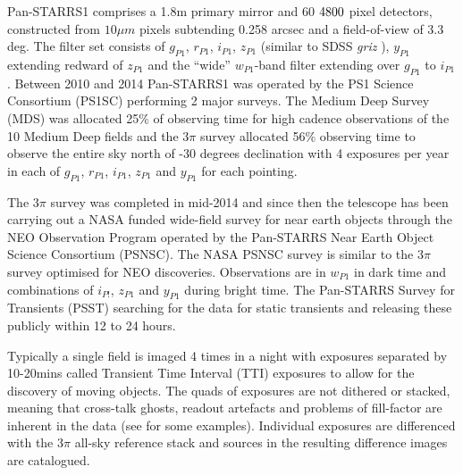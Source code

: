 \documentclass[a4paper,fleqn,usenatbib]{mnras}
\begin{document}


Pan-STARRS1 comprises a 1.8m primary mirror \citep{Kaiser10} and 60 $4800\time 4800$ pixel detectors, constructed from $10\mu m$ pixels subtending 0.258 arcsec \citep{Magnier13} and a field-of-view of 3.3 deg.  The filter set consists of $g_{P1}$, $r_{P1}$, $i_{P1}$, $z_{P1}$ (similar to SDSS \textit{griz} \citep{York00}), $y_{P1}$ extending
redward of $z_{P1}$ and the ``wide'' $w_{P1}$-band filter extending over $g_{P1}$ to $i_{P1}$ \citep{Tonry12b}.  Between 2010 and 2014 Pan-STARRS1 was operated by the PS1 Science Consortium (PS1SC) performing 2 major surveys.  The Medium Deep Survey (MDS) was allocated 25\% of observing time for high cadence observations of the 10 Medium Deep fields and the $3\pi$ survey allocated 56\% observing time to observe the entire sky north of -30 degrees declination with 4 exposures per year in each of $g_{P1}$, $r_{P1}$, $i_{P1}$, $z_{P1}$ and $y_{P1}$ for each pointing.

The $3\pi$ survey was completed in mid-2014 and since then the telescope has been carrying out a NASA funded wide-field survey for near earth objects through the NEO Observation Program operated by the Pan-STARRS Near Earth Object Science Consortium (PSNSC).  The NASA PSNSC survey is similar to the $3\pi$ survey optimised for NEO discoveries.  Observations are in $w_{P1}$ in dark time and combinations of $i_{P!}$, $z_{P1}$ and $y_{P1}$ during bright time.  The Pan-STARRS Survey for Transients (PSST) \citep{Huber15a} searching for the data for static transients and releasing these publicly within 12 to 24 hours.

Typically a single field is imaged 4 times in a night with exposures separated by 10-20mins called Transient Time Interval (TTI) exposures to allow for the discovery of moving objects.  The quads of exposures are not dithered or stacked, meaning that cross-talk ghosts, readout artefacts and problems of fill-factor are inherent in the data (see \citet{Denneau13} for some examples).  Individual exposures are differenced with the $3\pi$ all-sky reference stack and sources in the resulting difference images are catalogued.
\end{document}
